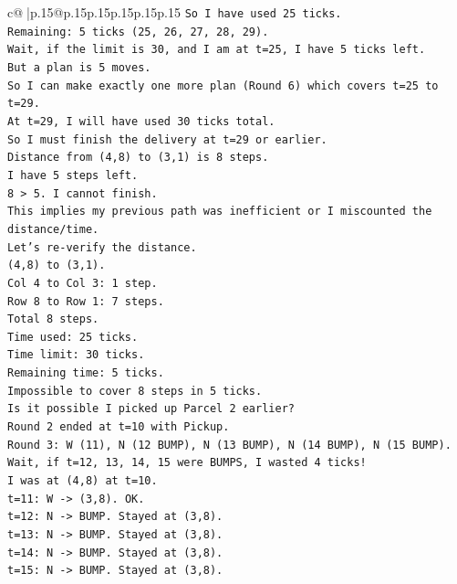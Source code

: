 \documentclass{article}
\begin{document}
{\begin{supertabular}{c@{$\;$}|p{.15\linewidth}@{}p{.15\linewidth}p{.15\linewidth}p{.15\linewidth}p{.15\linewidth}p{.15\linewidth}}
{{{\texttt{So I have used 25 ticks.} \\
\texttt{Remaining: 5 ticks (25, 26, 27, 28, 29).} \\
\texttt{Wait, if the limit is 30, and I am at t=25, I have 5 ticks left.} \\
\texttt{But a plan is 5 moves.} \\
\texttt{So I can make exactly one more plan (Round 6) which covers t=25 to t=29.} \\
\texttt{At t=29, I will have used 30 ticks total.} \\
\texttt{So I must finish the delivery at t=29 or earlier.} \\
\texttt{Distance from (4,8) to (3,1) is 8 steps.} \\
\texttt{I have 5 steps left.} \\
\texttt{8 > 5. I cannot finish.} \\
\texttt{This implies my previous path was inefficient or I miscounted the distance/time.} \\
\texttt{Let's re{-}verify the distance.} \\
\texttt{(4,8) to (3,1).} \\
\texttt{Col 4 to Col 3: 1 step.} \\
\texttt{Row 8 to Row 1: 7 steps.} \\
\texttt{Total 8 steps.} \\
\texttt{Time used: 25 ticks.} \\
\texttt{Time limit: 30 ticks.} \\
\texttt{Remaining time: 5 ticks.} \\
\texttt{Impossible to cover 8 steps in 5 ticks.} \\
\texttt{Is it possible I picked up Parcel 2 earlier?} \\
\texttt{Round 2 ended at t=10 with Pickup.} \\
\texttt{Round 3: W (11), N (12 BUMP), N (13 BUMP), N (14 BUMP), N (15 BUMP).} \\
\texttt{Wait, if t=12, 13, 14, 15 were BUMPS, I wasted 4 ticks!} \\
\texttt{I was at (4,8) at t=10.} \\
\texttt{t=11: W {-}> (3,8). OK.} \\
\texttt{t=12: N {-}> BUMP. Stayed at (3,8).} \\
\texttt{t=13: N {-}> BUMP. Stayed at (3,8).} \\
\texttt{t=14: N {-}> BUMP. Stayed at (3,8).} \\
\texttt{t=15: N {-}> BUMP. Stayed at (3,8).} \\
}}}
\end{supertabular}}
\end{document}
